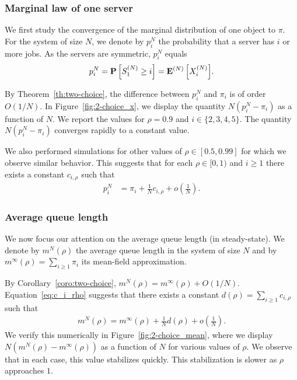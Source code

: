 \documentclass[sigconf]{acmart}
\newcommand\SN{S^{(N)}}
\newcommand\XN{X^{(N)}}
\newcommand\espN[1]{{\mathchoice{\bespN{#1}}{\sespN{#1}}{\sespN{#1}}{\sespN{#1}}}}
\newcommand\bespN[1]{\mathbf{E}^{(N)}\left[#1\right]}
\newcommand\sespN[1]{\mathbf{E}^{(N)}[#1]}
\newcommand\Proba[1]{{\mathchoice{\bProba{#1}}{\sProba{#1}}{\sProba{#1}}{\sProba{#1}}}}
\newcommand\bProba[1]{\mathbf{P}\left[#1\right]}
\newcommand\sProba[1]{\mathbf{P}[#1]}
\newcommand\p[1]{\left(#1\right)}
\begin{document}
\subsubsection{Marginal law of one server}

We first study the convergence of the marginal distribution of one
object to $\pi$. For the system of size $N$, we denote by $p^N_i$ the
probability that a server has $i$ or more jobs. As the servers are
symmetric, $p^N_i$ equals
\begin{align*}
  p^N_i=\Proba{\SN_1\ge i} = \espN{\XN_i}. 
\end{align*}

By Theorem~\ref{th:two-choice}, the difference between $p^N_i$ and
$\pi_i$ is of order $O(1/N)$. In Figure~\ref{fig:2-choice_x}, we
display the quantity $N(p^N_i-\pi_i)$ as a function of $N$. We report
the values for $\rho=0.9$ and $i\in\{2,3,4,5\}$. The quantity
$N(p^N_i-\pi_i)$ converges rapidly to a constant value.

We also performed simulations for other values of $\rho\in[0.5,0.99]$
for which we observe similar behavior.  This suggests that for each
$\rho\in[0,1)$ and $i\ge1$ there exists a constant $c_{i,\rho}$ such
that
\begin{align}
  \label{eq:c_i_rho}
  p^N_i&=\pi_i + \frac1N c_{i,\rho} + o\p{\frac1N}.
\end{align}


\subsubsection{Average queue length}


We now focus our attention on the average queue length (in
steady-state). We denote by $m^N(\rho)$ the average queue length in
the system of size $N$ and by $m^\infty(\rho)= \sum_{i\ge1}\pi_i$ its
mean-field approximation.

By Corollary~\ref{coro:two-choice},
$m^N(\rho) = m^\infty(\rho)+O(1/N)$. Equation~\eqref{eq:c_i_rho}
suggests that there exists a constant
$d(\rho)=\sum_{i\ge1}c_{i,\rho}$ such that
\begin{align}
  \label{eq:improved_mf}
  m^N(\rho)=m^\infty(\rho) + \frac{1}{N}d(\rho) + o\p{\frac1N}.
\end{align} 
We verify this numerically in Figure~\ref{fig:2-choice_mean}, where we
display $N(m^N(\rho)-m^\infty(\rho))$ as a function of $N$ for various
values of $\rho$.  We observe that in each case, this value stabilizes
quickly. This stabilization is slower as $\rho$ approaches $1$.
\end{document}

